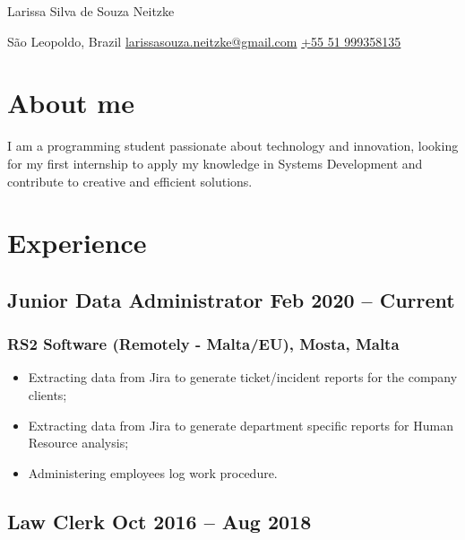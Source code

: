\documentclass[11pt]{article}
\begin{document}
\begin{center}      
    {\fontsize{28}{28}\selectfont Larissa Silva de Souza Neitzke} \\ \bigskip

    {\color{icnclr}\faMapMarker} São Leopoldo, Brazil \quad 
    {\color{icnclr}\faEnvelope[regular]} \href{mailto:myaname@email.com}{larissasouza.neitzke@gmail.com} \quad
    {\color{icnclr}} \href{tel:+920000000000}{+55 51 999358135} 
\end{center}
\section{About me}
I am a programming student passionate about technology and innovation, looking for my first internship to apply my knowledge in Systems Development and contribute to creative and efficient solutions. 
\section{Experience}
\subsection{Junior Data Administrator \hfill \normalfont Feb 2020 -- Current}
\subsubsection{RS2 Software (Remotely - Malta/EU), Mosta, Malta}
\begin{itemize}
    \item[\checkmark] Extracting data from Jira to generate ticket/incident reports for the company clients; 
    \item[\checkmark]  Extracting data from Jira to generate department specific reports for Human Resource analysis;
    \item[\checkmark] Administering employees log work procedure.
\end{itemize}

\subsection{Law Clerk \hfill \normalfont Oct 2016 -- Aug 2018}
\end{document}
